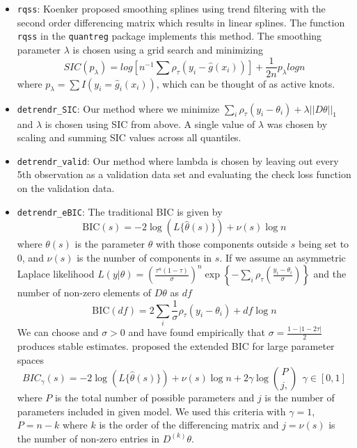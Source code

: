 \documentclass[12pt]{article}
\numberwithin{equation}{section}
\theoremstyle{plain}
\begin{document}
\begin{itemize}
	\item \texttt{rqss}: \cite{KoenkerNgPortnoy1994} Koenker proposed smoothing splines using trend filtering with the second order differencing matrix which results in linear splines. The function \texttt{rqss} in the \texttt{quantreg} package implements this method. The smoothing parameter $\lambda$ is chosen using a grid search and minimizing 
	\begin{equation}
	SIC(p_{\lambda}) = log[n^{-1}\sum\rho_{\tau}(y_i - \widehat{g}(x_i))] + \frac{1}{2n}p_{\lambda}log n
	\end{equation}
	where $p_{\lambda} = \sum I(y_i = \widehat{g}_i(x_i))$, which can be thought of as active knots.
	
	\item \texttt{detrendr\_SIC}: Our method where we minimize
	$\sum_i\rho_{\tau}(y_i - \theta_i) + \lambda||D\theta||_1$ and $\lambda$ is chosen using SIC from above. A single value of $\lambda$ was chosen by scaling and summing SIC values across all quantiles. 
	\item \texttt{detrendr\_valid}: Our method where lambda is chosen by leaving out every 5th observation as a validation data set and evaluating the check loss function on the validation data.
	\item \texttt{detrendr\_eBIC}:   The traditional BIC is given by 
	\begin{equation}
	\mbox{BIC}(s) = -2\log(L\{\hat{\theta}(s)\}) + \nu(s)\log n 
	\end{equation}	
	where $\theta(s)$ is the parameter $\theta$ with those components outside $s$ being set to 0, and $\nu(s)$ is the number of components in $s$. If we assume an asymmetric Laplace likelihood $L(y|\theta) = \left(\frac{\tau^n(1-\tau)}{\sigma}\right)^n\exp\left\{-\sum_i\rho_\tau(\frac{y_i - \theta_i}{\sigma})\right\}$ and the number of non-zero elements of $D\theta$ as $df$
	\begin{equation}
	\mbox{BIC}(df) = 2\sum_i\frac{1}{\sigma}\rho_{\tau}(y_i-\theta_i) + df\log n
	\end{equation} 
	We can choose and $\sigma>0$ and have found empirically that $\sigma =  \frac{1-|1-2\tau|}{2}$ produces stable estimates. \cite{chen2008} proposed the extended BIC for large parameter spaces 
	\begin{equation}
	BIC_{\gamma}(s) = -2\log(L\{\hat{\theta}(s)\}) + \nu(s)\log n  + 2\gamma\log{P\choose j,}~~\gamma \in [0,1]
	\end{equation}
	where $P$ is the total number of possible parameters and $j$ is the number of parameters included in given model. We used this criteria with $\gamma = 1$, $P=n-k$ where $k$ is the order of the differencing matrix and $j = \nu(s)$ is the number of non-zero entries in $D^{(k)}\theta$. 
	
\end{itemize}
\end{document}
